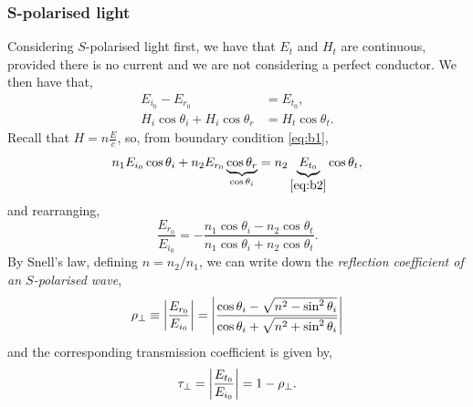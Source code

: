 \documentclass{book}
\begin{document}
\subsubsection{S-polarised light}
Considering $S$-polarised light first, we have that $E_t$ and $H_t$ are continuous, provided there is no current and we are not considering a perfect conductor. We then have that,
\begin{align}
	E_{i_0} - E_{r_0} &= E_{t_0}, \label{eq:b2}\\
	H_i\cos\theta_i + H_i\cos\theta_r &= H_t\cos\theta_t. \label{eq:b1}
\end{align}
Recall that $H = n\frac{E}{c}$, so, from boundary condition \eqref{eq:b1},
\begin{equation}
	n_1E_{i_0}\cos\theta_i + n_2E_{r_0}\underbrace{\cos\theta_r}_{\cos\theta_i} = n_2\underbrace{E_{t_0}}_{\eqref{eq:b2}} \cos\theta_t,
\end{equation}
and rearranging,
\begin{equation}
	\frac{E_{r_0}}{E_{i_0}} = -\frac{n_1\cos\theta_i - n_2 \cos\theta_t}{n_1\cos\theta_i + n_2\cos\theta_t}.
\end{equation}
By Snell's law, defining $n = n_2/n_1$, we can write down the \textit{reflection coefficient of an $S$-polarised wave},
\begin{equation}
	\rho_{\perp} \equiv \abs{\frac{E_{r_0}}{E_{i_0}}} = \abs{\frac{\cos\theta_i - \sqrt{n^2 - \sin^2\theta_i}}{\cos\theta_i + \sqrt{n^2 + \sin^2\theta_i}}}
\end{equation}
and the corresponding transmission coefficient is given by,
\begin{equation}
	\tau_{\perp} = \abs{\frac{E_{t_0}}{E_{i_0}}} = 1 - \rho_{\perp}.
\end{equation}
\end{document}
